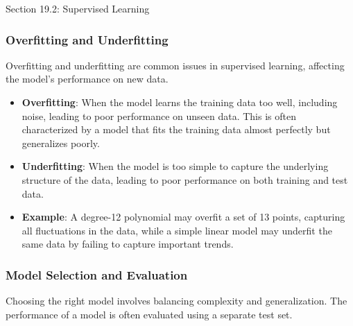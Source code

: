 \begin{notes}{Section 19.2: Supervised Learning}
\begin{highlight}
    \end{highlight}
    
    \subsubsection*{Overfitting and Underfitting}
    
    Overfitting and underfitting are common issues in supervised learning, affecting the model's performance on new data.
    
    \begin{highlight}
    
        \begin{itemize}
            \item \textbf{Overfitting}: When the model learns the training data too well, including noise, leading to poor performance on unseen data. This is often characterized by a model that fits the training data almost perfectly but generalizes poorly.
            \item \textbf{Underfitting}: When the model is too simple to capture the underlying structure of the data, leading to poor performance on both training and test data.
            \item \textbf{Example}: A degree-12 polynomial may overfit a set of 13 points, capturing all fluctuations in the data, while a simple linear model may underfit the same data by failing to capture important trends.
        \end{itemize}
    
    \end{highlight}
    
    \subsubsection*{Model Selection and Evaluation}
    
    Choosing the right model involves balancing complexity and generalization. The performance of a model is often evaluated using a separate test set.
    
    \begin{highlight}
    

\end{highlight}
\end{notes}
